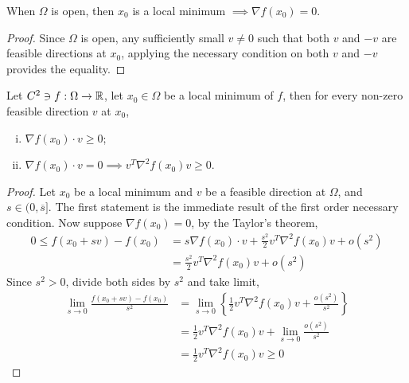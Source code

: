 \documentclass{article}
\begin{document}
   	\begin{corollary}
   		When $\Omega$ is open, then $x_0$ is a local minimum $\implies \nabla f(x_0) = 0$.
   	\end{corollary}
   	\begin{proof}
   		Since $\Omega$ is open, any sufficiently small $v \neq 0$ such that both $v$ and $-v$ are feasible directions at $x_0$, applying the necessary condition on both $v$ and $-v$ provides the equality.
   	\end{proof}
   	
%   	
   	
   	\begin{theorem}
   		Let $C^2 \ni f: \Omega \to \mathbb{R}$, let $x_0 \in \Omega$ be a local minimum of $f$, then for every non-zero feasible direction $v$ at $x_0$,
   		\begin{enumerate}[(i)]
   			\item $\nabla f(x_0) \cdot v \geq 0$;
   			\item $\nabla f(x_0) \cdot v = 0 \implies v^T \nabla^2 f(x_0) v \geq 0$.
   		\end{enumerate}
   	\end{theorem}
   	
   	\begin{proof}
   		Let $x_0$ be a local minimum and $v$ be a feasible direction at $\Omega$, and $s \in (0, \overline{s}]$. The first statement is the immediate result of the first order necessary condition. Now suppose $\nabla f(x_0) = 0$, by the Taylor's theorem,
   		\begin{align}
   			0 \leq f(x_0 + sv) - f(x_0) &= s \nabla f(x_0) \cdot v + \frac{s^2}{2} v^T \nabla^2 f(x_0) v + o(s^2) \\
   			&=\frac{s^2}{2} v^T \nabla^2 f(x_0) v + o(s^2)
   		\end{align}
   		Since $s^2 > 0$, divide both sides by $s^2$ and take limit,
   		\begin{align}
   			\lim_{s \to 0} \frac{f(x_0 + sv) - f(x_0)}{s^2} &= \lim_{s \to 0} 
   			\left \{\frac{1}{2} v^T \nabla^2 f(x_0) v + \frac{o(s^2)}{s^2} \right\}\\
   			&= \frac{1}{2} v^T \nabla^2 f(x_0) v + \lim_{s \to 0} \frac{o(s^2)}{s^2} \\
   			&= \frac{1}{2} v^T \nabla^2 f(x_0) v \geq 0
   		\end{align}
   	\end{proof}
   	
\end{document}
